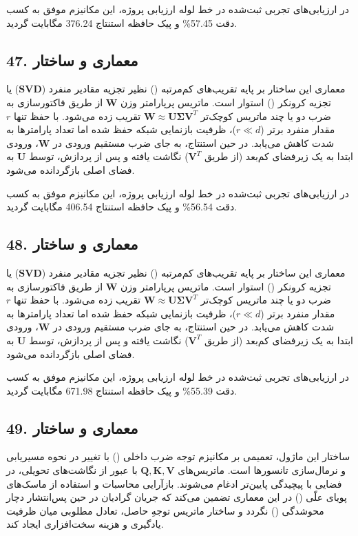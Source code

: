 \documentclass[12pt,a4paper]{report}
\theoremstyle{definition}
\begin{document}
در ارزیابی‌های تجربی ثبت‌شده در خط لوله ارزیابی پروژه، این مکانیزم موفق به کسب دقت 57.45\% و پیک حافظه استنتاج 376.24 مگابایت گردید.

\subsection*{47. معماری و ساختار }
معماری این ساختار بر پایه تقریب‌های کم‌مرتبه () نظیر تجزیه مقادیر منفرد ($\mathbf{SVD}$) یا تجزیه کرونکر () استوار است. ماتریس پرپارامتر وزن $\mathbf{W}$ از طریق فاکتورسازی به ضرب دو یا چند ماتریس کوچک‌تر $\mathbf{W} \approx \mathbf{U} \mathbf{\Sigma} \mathbf{V}^T$ تقریب زده می‌شود. با حفظ تنها $r$ مقدار منفرد برتر ($r \ll d$)، ظرفیت بازنمایی شبکه حفظ شده اما تعداد پارامترها به شدت کاهش می‌یابد. در حین استنتاج، به جای ضرب مستقیم ورودی در $\mathbf{W}$، ورودی ابتدا به یک زیرفضای کم‌بعد (از طریق $\mathbf{V}^T$) نگاشت یافته و پس از پردازش، توسط $\mathbf{U}$ به فضای اصلی بازگردانده می‌شود.

در ارزیابی‌های تجربی ثبت‌شده در خط لوله ارزیابی پروژه، این مکانیزم موفق به کسب دقت 56.54\% و پیک حافظه استنتاج 406.54 مگابایت گردید.

\subsection*{48. معماری و ساختار }
معماری این ساختار بر پایه تقریب‌های کم‌مرتبه () نظیر تجزیه مقادیر منفرد ($\mathbf{SVD}$) یا تجزیه کرونکر () استوار است. ماتریس پرپارامتر وزن $\mathbf{W}$ از طریق فاکتورسازی به ضرب دو یا چند ماتریس کوچک‌تر $\mathbf{W} \approx \mathbf{U} \mathbf{\Sigma} \mathbf{V}^T$ تقریب زده می‌شود. با حفظ تنها $r$ مقدار منفرد برتر ($r \ll d$)، ظرفیت بازنمایی شبکه حفظ شده اما تعداد پارامترها به شدت کاهش می‌یابد. در حین استنتاج، به جای ضرب مستقیم ورودی در $\mathbf{W}$، ورودی ابتدا به یک زیرفضای کم‌بعد (از طریق $\mathbf{V}^T$) نگاشت یافته و پس از پردازش، توسط $\mathbf{U}$ به فضای اصلی بازگردانده می‌شود.

در ارزیابی‌های تجربی ثبت‌شده در خط لوله ارزیابی پروژه، این مکانیزم موفق به کسب دقت 55.39\% و پیک حافظه استنتاج 671.98 مگابایت گردید.

\subsection*{49. معماری و ساختار }
ساختار این ماژول، تعمیمی بر مکانیزم توجه ضرب داخلی () با تغییر در نحوه مسیریابی و نرمال‌سازی تانسورها است. ماتریس‌های $\mathbf{Q, K, V}$ با عبور از نگاشت‌های تحویلی، در فضایی با پیچیدگی پایین‌تر ادغام می‌شوند. بازآرایی محاسبات و استفاده از ماسک‌های پویای علّی () در این معماری تضمین می‌کند که جریان گرادیان در حین پس‌انتشار دچار محوشدگی () نگردد و ساختار ماتریس توجهِ حاصل، تعادل مطلوبی میان ظرفیت یادگیری و هزینه سخت‌افزاری ایجاد کند.
\end{document}
